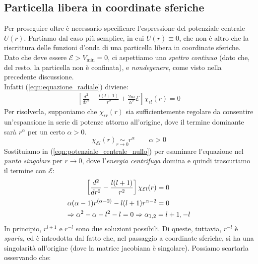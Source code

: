\documentclass[../../FisicaTeorica.tex]{subfiles}
\begin{document}
\subsection{Particella libera in coordinate sferiche}
Per proseguire oltre è necessario specificare l'espressione del potenziale centrale $U(r)$. Partiamo dal caso più semplice, in cui $U(r) \equiv 0$, che non è altro che la riscrittura delle funzioni d'onda di una particella libera in coordinate sferiche. Dato che deve essere $\mathcal{E} > V_{\min}=0$, ci aspettiamo uno \textit{spettro continuo} (dato che, del resto, la particella non è confinata), e \textit{nondegenere}, come visto nella precedente discussione.\\
Infatti (\ref{eqn:equazione_radiale}) diviene:
\begin{align}
\left[\frac{d^2}{dr^2}-\frac{l(l+1)}{r^2} + \frac{2m}{\hbar^2}\mathcal{E}\right] \chi_{\epsilon l}(r) = 0
\label{eqn:potenziale_centrale_nullo}
\end{align}
Per risolverla, supponiamo che $\chi_{\epsilon r}(r)$ sia sufficientemente regolare da consentire un'espansione in serie di potenze attorno all'origine, dove il termine dominante sarà $r^\alpha$ per un certo $\alpha > 0$. 
\begin{equation}
\chi_{\mathcal{E}l}(r) \underset{r \to 0}{\sim} r^\alpha \qquad \alpha > 0
\label{eqn:punto_zero}
\end{equation}
Sostituiamo in (\ref{eqn:potenziale_centrale_nullo}) per esaminare l'equazione nel \textit{punto singolare} per $r\to 0$, dove l'\textit{energia centrifuga} domina e quindi trascuriamo il termine con $\mathcal{E}$:
\begin{align}\nonumber
\left[\frac{d^2}{dr^2}-\frac{l(l+1)}{r^2}\right] \chi_{\mathcal{E}l}(r)&=0\\
\alpha(\alpha -1 )r^{(\alpha-2)} - l(l+1)r^{\alpha-2}&=0 \label{eqn:asintoto-origine}\\
\Rightarrow \alpha^2 - \alpha - l^2 - l = 0 \Rightarrow \alpha_{1,2} = l+1, -l \span \nonumber
\end{align}
In principio, $r^{l+1}$ e $r^{-l}$ sono due soluzioni possibili. Di queste, tuttavia, $r^{-l}$ è \textit{spuria}, ed è introdotta dal fatto che, nel passaggio a coordinate sferiche, si ha una singolarità all'origine (dove la matrice jacobiana è singolare). Possiamo scartarla osservando che:
\end{document}
